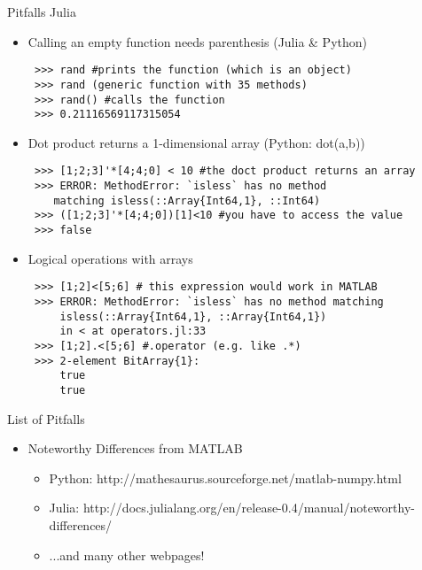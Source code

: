 \documentclass[11pt,t]{beamer}
\begin{document}
\begin{frame}[fragile]{Pitfalls Julia}
	\begin{itemize}

	\item Calling an empty function needs parenthesis (Julia \& Python)
	\scriptsize
	\begin{lstlisting}
 >>> rand #prints the function (which is an object)
 >>> rand (generic function with 35 methods)
 >>> rand() #calls the function
 >>> 0.21116569117315054
	\end{lstlisting}
	\normalsize
	\item Dot product returns a 1-dimensional array (Python: dot(a,b))
	\scriptsize
	\begin{lstlisting}
 >>> [1;2;3]'*[4;4;0] < 10 #the doct product returns an array
 >>> ERROR: MethodError: `isless` has no method 
    matching isless(::Array{Int64,1}, ::Int64)
 >>> ([1;2;3]'*[4;4;0])[1]<10 #you have to access the value
 >>> false
	\end{lstlisting}
	\normalsize  
	\item Logical operations with arrays
	\scriptsize
	\begin{lstlisting}
 >>> [1;2]<[5;6] # this expression would work in MATLAB
 >>> ERROR: MethodError: `isless` has no method matching 
     isless(::Array{Int64,1}, ::Array{Int64,1})
     in < at operators.jl:33
 >>> [1;2].<[5;6] #.operator (e.g. like .*)
 >>> 2-element BitArray{1}:
     true
     true
	\end{lstlisting}
	\normalsize
	\end{itemize}
\end{frame}
\begin{frame}[fragile]{List of Pitfalls}
	\begin{itemize}

	\item Noteworthy Differences from MATLAB
	\begin{itemize}
	\vspace{1.4cm}
	\item Python: http://mathesaurus.sourceforge.net/matlab-numpy.html
	\vspace{0.7cm}
	\item Julia: http://docs.julialang.org/en/release-0.4/manual/noteworthy-differences/
	\vspace{0.4cm}
	\item ...and many other webpages!
	\end{itemize}

	\end{itemize}
\end{frame}
\end{document}
